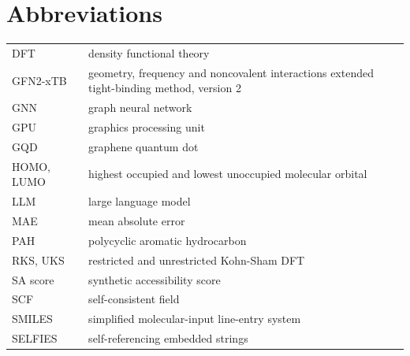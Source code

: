 \documentclass[12pt,letterpaper,oneside]{report}
\begin{document}
\tableofcontents
\listoffigures
\listoftables

\chapter*{Abbreviations}
\begin{tabularx}{\textwidth}{@{}lL@{}}
  DFT & density functional theory \\
  GFN2-xTB & geometry, frequency and noncovalent interactions extended tight-binding method, version 2 \\
  GNN & graph neural network \\
  GPU & graphics processing unit \\
  GQD & graphene quantum dot \\
  HOMO, LUMO & highest occupied and lowest unoccupied molecular orbital \\
  LLM & large language model \\
  MAE & mean absolute error \\
  PAH & polycyclic aromatic hydrocarbon \\
  RKS, UKS & restricted and unrestricted Kohn-Sham DFT \\
  SA score & synthetic accessibility score \\
  SCF & self-consistent field \\
  SMILES & simplified molecular-input line-entry system \\
  SELFIES & self-referencing embedded strings \\
\end{tabularx}

\cleardoublepage
{}









\appendix
{}




\cleardoublepage
{}
{}


\end{document}

